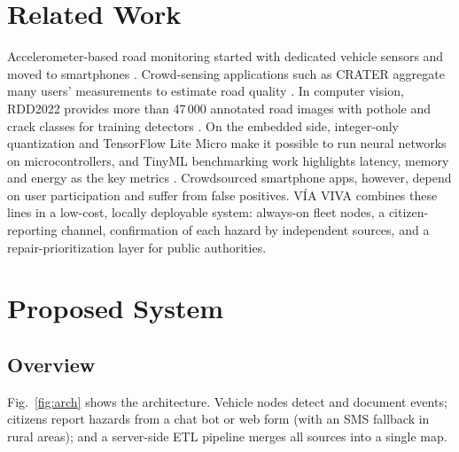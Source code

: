 \documentclass[journal,10pt]{IEEEtran}
\begin{document}
\section{Related Work}
Accelerometer-based road monitoring started with dedicated vehicle sensors \cite{eriksson2008pothole} and moved to smartphones \cite{mohan2008nericell,mednis2011pothole}. Crowd-sensing applications such as CRATER aggregate many users' measurements to estimate road quality \cite{kalim2016crater}. In computer vision, RDD2022 provides more than 47\,000 annotated road images with pothole and crack classes for training detectors \cite{arya2022rdd}. On the embedded side, integer-only quantization \cite{jacob2018quant} and TensorFlow Lite Micro \cite{david2021tflm} make it possible to run neural networks on microcontrollers, and TinyML benchmarking work highlights latency, memory and energy as the key metrics \cite{banbury2020tinyml}. Crowdsourced smartphone apps, however, depend on user participation and suffer from false positives. V\'IA VIVA combines these lines in a low-cost, locally deployable system: always-on fleet nodes, a citizen-reporting channel, confirmation of each hazard by independent sources, and a repair-prioritization layer for public authorities.

\section{Proposed System}
\subsection{Overview}
Fig.~\ref{fig:arch} shows the architecture. Vehicle nodes detect and document events; citizens report hazards from a chat bot or web form (with an SMS fallback in rural areas); and a server-side ETL pipeline merges all sources into a single map.
\end{document}
